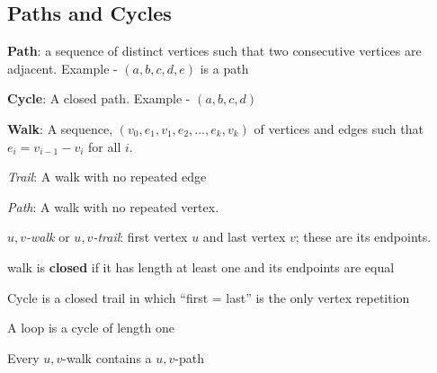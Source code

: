 \documentclass{article}
\theoremstyle{definition}
\theoremstyle{definition}
\newenvironment{manualprop}[1]{%
  \renewcommand\themanualpropinner{#1}%
  \manualpropinner
}{\endmanualpropinner}
\theoremstyle{named}
\begin{document}
\subsection{Paths and Cycles}
\begin{compactitem}
    \item \textbf{Path}: a sequence of distinct vertices such that
two consecutive vertices are adjacent. Example - $(a, b, c, d, e)$ is a path

    \item \textbf{Cycle}: A closed path. Example - $(a, b, c, d)$

    \item \textbf{Walk}: A sequence, $(v_0,e_1,v_1,e_2, ...,  e_k,v_k)$
of vertices and edges such that $e_i = v_{i-1} - v_i$ for all $i$.
    \begin{compactitem}
        \item \textit{Trail}: A walk with no repeated edge
        \item \textit{Path}: A walk with no repeated vertex.
        \item \textit{$u,v$-walk} or \textit{$u,v$-trail}:  first vertex $u$ and last vertex
$v$; these are its endpoints.
        \item walk is \textbf{closed} if it has length at least one and its endpoints are equal
        \begin{compactitem}
            \item Cycle is a closed trail in which “first = last” is the only vertex repetition
            \item A loop is a cycle of length one
        \end{compactitem}
    \end{compactitem}
\end{compactitem}

\begin{manualprop}{31}
    Every $u,v$-walk contains a $u,v$-path
\end{manualprop}
\end{document}
